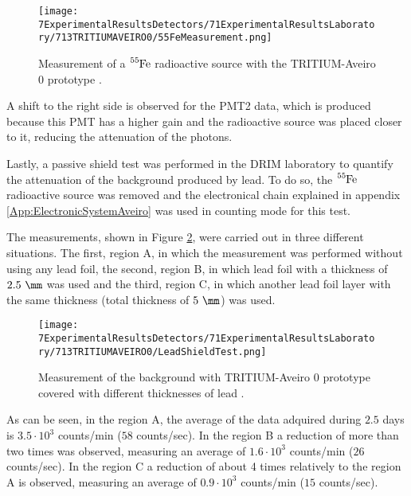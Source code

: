 \begin{figure}[h]
\centering
\texttt{[image: 7ExperimentalResultsDetectors/71ExperimentalResultsLaboratory/713TRITIUMAVEIRO0/55FeMeasurement.png]}
\caption{Measurement of a $\ce{^{55}Fe}$ radioactive source with the TRITIUM-Aveiro 0 prototype \cite{ExperimentalPaperCarlos}.\label{fig:55FeMeasurement}}
\end{figure}

A shift to the right side is observed for the PMT2 data, which is produced because this PMT has a higher gain and the radioactive source was placed closer to it, reducing the attenuation of the photons.

Lastly, a passive shield test was performed in the DRIM laboratory to quantify the attenuation of the background produced by lead. To do so, the $\ce{^{55}Fe}$ radioactive source was removed and the electronical chain explained in appendix \ref{App:ElectronicSystemAveiro} was used in counting mode for this test.

The measurements, shown in Figure \ref{fig:LeadShieldTest}, were carried out in three different situations. The first, region A, in which the measurement was performed without using any lead foil, the second, region B, in which lead foil with a thickness of $2.5~\mm$ was used and the third, region C, in which another lead foil layer with the same thickness (total thickness of $5~\mm$) was used.

\begin{figure}[h]
\centering
\texttt{[image: 7ExperimentalResultsDetectors/71ExperimentalResultsLaboratory/713TRITIUMAVEIRO0/LeadShieldTest.png]}
\caption{Measurement of the background with TRITIUM-Aveiro 0 prototype covered with different thicknesses of lead \cite{ExperimentalPaperCarlos}.\label{fig:LeadShieldTest}}
\end{figure}

As can be seen, in the region A, the average of the data adquired during $2.5$ days is $3.5 \cdot{} 10^3$ counts/min ($58$ counts/sec). In the region B a reduction of more than two times was observed, measuring an average of $1.6 \cdot{} 10^3$ counts/min ($26$ counts/sec). In the region C a reduction of about 4 times relatively to the region A is observed, measuring an average of $0.9 \cdot{} 10^3$ counts/min ($15$ counts/sec).


